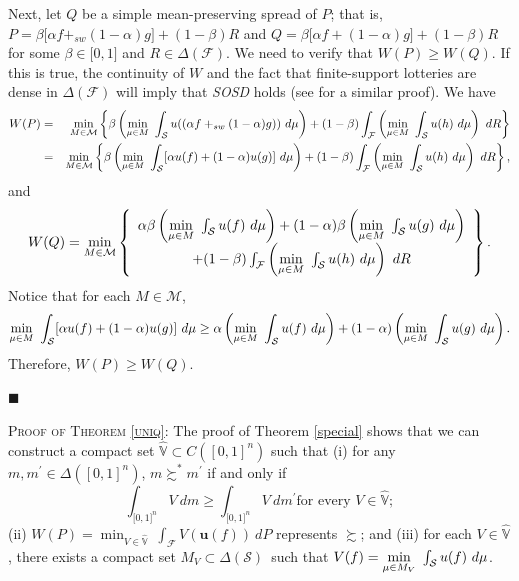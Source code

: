 \documentclass[12pt, notitlepage]{article}
\begin{document}
Next, {let $Q$ be a simple mean-preserving spread of $P$; that is, $P=\beta
\lbrack \alpha f+_{sw}(1-\alpha )g]+(1-\beta )R$ and $Q=\beta \lbrack \alpha
f+(1-\alpha )g]+(1-\beta )R$ for some $\beta \in \lbrack 0,1]$ and $R\in
\Delta (\mathcal{F})$. We need to verify that $W(P)\geq W(Q)$. If this is
true, the continuity of }$W$ and the fact that finite-support lotteries are
dense in $\Delta (\mathcal{F})$ will imply that \textit{SOSD} holds (see 
\cite{RothschildStiglitz70} for a similar proof). We have{%
\begin{eqnarray*}
W(P) &=&\min_{M\in \mathcal{M}}\left\{ \beta \left( \underset{\mu \in M}{%
\min }~\int_{\mathcal{S}}u((\alpha f+_{sw}(1-\alpha )g))~d\mu \right)
+(1-\beta )\int_{\mathcal{F}}\left( \underset{\mu \in M}{\min }~\int_{%
\mathcal{S}}u(h)~d\mu \right) ~dR\right\} \\
&=&\min_{M\in \mathcal{M}}\left\{ \beta \left( \underset{\mu \in M}{\min }%
~\int_{\mathcal{S}}[\alpha u(f)+(1-\alpha )u(g)]~d\mu \right) +(1-\beta
)\int_{\mathcal{F}}\left( \underset{\mu \in M}{\min }~\int_{\mathcal{S}%
}u(h)~d\mu \right) ~dR\right\} ,
\end{eqnarray*}%
and%
\begin{equation*}
W(Q)=\min_{M\in \mathcal{M}}\left\{ 
\begin{array}{c}
\alpha \beta \left( \underset{\mu \in M}{\min }~\int_{\mathcal{S}}u(f)~d\mu
\right) +(1-\alpha )\beta \left( \underset{\mu \in M}{\min }~\int_{\mathcal{S%
}}u(g)~d\mu \right) \\ 
+(1-\beta )\int_{\mathcal{F}}\left( \underset{\mu \in M}{\min }~\int_{%
\mathcal{S}}u(h)~d\mu \right) ~dR%
\end{array}%
\right\} .
\end{equation*}%
Notice that for each $M\in \mathcal{M}$,%
\begin{equation*}
\underset{\mu \in M}{\min }~\int_{\mathcal{S}}[\alpha u(f)+(1-\alpha
)u(g)]~d\mu \geq \alpha \left( \underset{\mu \in M}{\min }~\int_{\mathcal{S}%
}u(f)~d\mu \right) +(1-\alpha )\left( \underset{\mu \in M}{\min }~\int_{%
\mathcal{S}}u(g)~d\mu \right) .
\end{equation*}%
Therefore, $W(P)\geq W(Q)$.}

\begin{flushleft}
{$\blacksquare $\linebreak }
\end{flushleft}

{\textsc{Proof of Theorem \ref{uniq}}: The proof of Theorem \ref{special}
shows that we can construct }a compact set $\widehat{\mathbb{V}}\subset
C([0,1]^{n})$ such that (\textrm{i}) for any $m,m^{\prime }\in \Delta
([0,1]^{n})$, $m\succsim ^{\ast }m^{\prime }$ if and only if%
\begin{equation*}
\int_{\lbrack 0,1]^{n}}V~dm\geq \int_{\lbrack 0,1]^{n}}V~dm^{\prime }\text{
for every }V\in \widehat{\mathbb{V}};
\end{equation*}%
(\textrm{ii}) $W(P)=\min_{V\in \widehat{\mathbb{V}}}~\int_{\mathcal{F}}V(%
\mathbf{u}(f))~dP$ represents $\succsim $; and (\textrm{iii}) for each $V\in 
\widehat{\mathbb{V}}$, there exists {a compact set }$M_{V}\subset \Delta (%
\mathcal{S})${\ such that $V(f)=\underset{\mu \in M_{V}}{\min }~\int_{%
\mathcal{S}}u(f)~d\mu $.}
\end{document}
